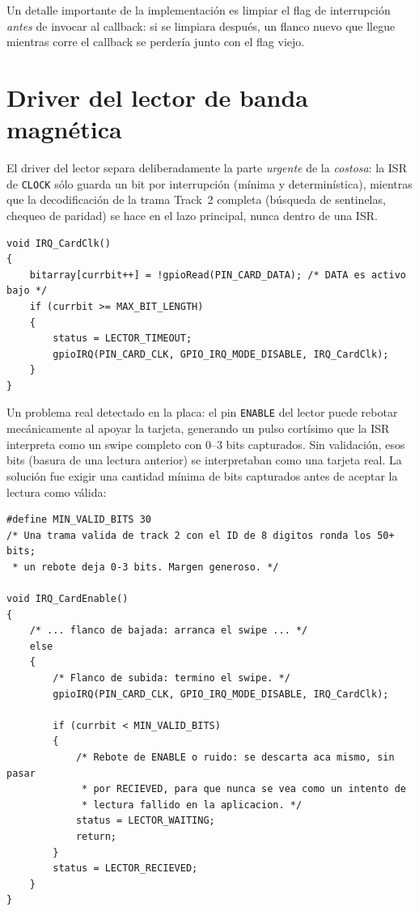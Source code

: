 \documentclass[11pt,a4paper]{article}
\begin{document}
Un detalle importante de la implementación es limpiar el flag de
interrupción \emph{antes} de invocar al callback: si se limpiara después,
un flanco nuevo que llegue mientras corre el callback se perdería junto
con el flag viejo.


\section{Driver del lector de banda magnética}

El driver del lector separa deliberadamente la parte \emph{urgente} de la
\emph{costosa}: la ISR de \lstinline{CLOCK} sólo guarda un bit por
interrupción (mínima y determinística), mientras que la decodificación de
la trama Track~2 completa (búsqueda de sentinelas, chequeo de paridad) se
hace en el lazo principal, nunca dentro de una ISR.

\begin{lstlisting}[caption={ISR mínima: un bit por interrupción (\texttt{lector.c}).}, label={lst:irqclk}]
void IRQ_CardClk()
{
    bitarray[currbit++] = !gpioRead(PIN_CARD_DATA); /* DATA es activo bajo */
    if (currbit >= MAX_BIT_LENGTH)
    {
        status = LECTOR_TIMEOUT;
        gpioIRQ(PIN_CARD_CLK, GPIO_IRQ_MODE_DISABLE, IRQ_CardClk);
    }
}
\end{lstlisting}

Un problema real detectado en la placa: el pin \lstinline{ENABLE} del
lector puede rebotar mecánicamente al apoyar la tarjeta, generando un pulso
cortísimo que la ISR interpreta como un swipe completo con 0--3 bits
capturados. Sin validación, esos bits (basura de una lectura anterior) se
interpretaban como una tarjeta real. La solución fue exigir una cantidad
mínima de bits capturados antes de aceptar la lectura como válida:

\begin{lstlisting}[caption={Rechazo de rebotes de \texttt{ENABLE} por cantidad insuficiente de bits (\texttt{lector.c}).}, label={lst:bounce}]
#define MIN_VALID_BITS 30
/* Una trama valida de track 2 con el ID de 8 digitos ronda los 50+ bits;
 * un rebote deja 0-3 bits. Margen generoso. */

void IRQ_CardEnable()
{
    /* ... flanco de bajada: arranca el swipe ... */
    else
    {
        /* Flanco de subida: termino el swipe. */
        gpioIRQ(PIN_CARD_CLK, GPIO_IRQ_MODE_DISABLE, IRQ_CardClk);

        if (currbit < MIN_VALID_BITS)
        {
            /* Rebote de ENABLE o ruido: se descarta aca mismo, sin pasar
             * por RECIEVED, para que nunca se vea como un intento de
             * lectura fallido en la aplicacion. */
            status = LECTOR_WAITING;
            return;
        }
        status = LECTOR_RECIEVED;
    }
}
\end{lstlisting}
\end{document}
